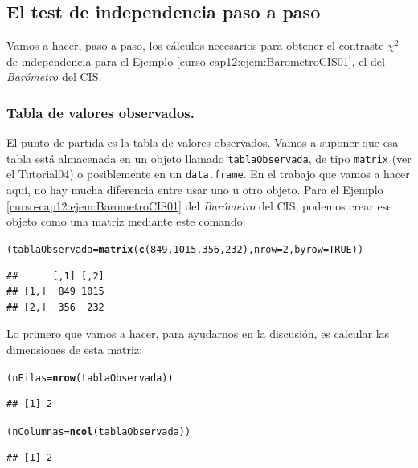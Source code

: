 \documentclass[10pt,a4paper]{article}\usepackage[]{graphicx}\usepackage[]{color}
\makeatletter
\newcommand{\hlnum}[1]{\textcolor[rgb]{0.686,0.059,0.569}{#1}}%
\newcommand{\hlstd}[1]{\textcolor[rgb]{0.345,0.345,0.345}{#1}}%
\newcommand{\hlkwb}[1]{\textcolor[rgb]{0.69,0.353,0.396}{#1}}%
\newcommand{\hlkwc}[1]{\textcolor[rgb]{0.333,0.667,0.333}{#1}}%
\newcommand{\hlkwd}[1]{\textcolor[rgb]{0.737,0.353,0.396}{\textbf{#1}}}%
\newenvironment{kframe}{%
 \def\at@end@of@kframe{}%
 \ifinner\ifhmode%
  \def\at@end@of@kframe{\end{minipage}}%
  \begin{minipage}{\columnwidth}%
 \fi\fi%
 \def\FrameCommand##1{\hskip\@totalleftmargin \hskip-\fboxsep
 \colorbox{shadecolor}{##1}\hskip-\fboxsep
     \hskip-\linewidth \hskip-\@totalleftmargin \hskip\columnwidth}%
 \MakeFramed {\advance\hsize-\width
   \@totalleftmargin\z@ \linewidth\hsize
   \@setminipage}}%
 {\par\unskip\endMakeFramed%
 \at@end@of@kframe}
\newenvironment{knitrout}{}{} %
\newcounter {cont01}
\makeatother
\begin{document}
\subsection{El test de independencia paso a paso}
\label{tut12:TestIndependenciaPasoAPaso}

Vamos a hacer, paso a paso, los cálculos necesarios para obtener el contraste $\chi^2$ de independencia para el Ejemplo \ref{curso-cap12:ejem:BarometroCIS01}, el del {\em Barómetro} del CIS.

\subsubsection*{Tabla de valores observados.}
\label{tut12:subsubsec:TablaValoresObservados}


El punto de partida es la tabla de valores observados. Vamos a suponer que esa tabla está almacenada en un objeto llamado {\tt tablaObservada}, de tipo {\tt matrix} (ver el Tutorial04) o posiblemente en un {\tt data.frame}. En el trabajo que vamos a hacer aquí, no hay mucha diferencia entre usar uno u otro objeto. Para el Ejemplo \ref{curso-cap12:ejem:BarometroCIS01} del {\em Barómetro} del CIS, podemos crear ese objeto como una matriz mediante este comando:


\begin{knitrout}
\color{fgcolor}\begin{kframe}
\begin{alltt}
\hlstd{(tablaObservada} \hlkwb{=} \hlkwd{matrix}\hlstd{(} \hlkwd{c}\hlstd{(}\hlnum{849}\hlstd{,} \hlnum{1015}\hlstd{,} \hlnum{356}\hlstd{,} \hlnum{232}\hlstd{),}  \hlkwc{nrow}\hlstd{=} \hlnum{2}\hlstd{,} \hlkwc{byrow} \hlstd{=} \hlnum{TRUE}\hlstd{))}
\end{alltt}
\begin{verbatim}
##      [,1] [,2]
## [1,]  849 1015
## [2,]  356  232
\end{verbatim}
\end{kframe}
\end{knitrout}

Lo primero que vamos a hacer, para ayudarnos en la discusión, es calcular las dimensiones de esta matriz:

\begin{knitrout}
\color{fgcolor}\begin{kframe}
\begin{alltt}
\hlstd{(nFilas} \hlkwb{=} \hlkwd{nrow}\hlstd{(tablaObservada))}
\end{alltt}
\begin{verbatim}
## [1] 2
\end{verbatim}
\begin{alltt}
\hlstd{(nColumnas} \hlkwb{=} \hlkwd{ncol}\hlstd{(tablaObservada))}
\end{alltt}
\begin{verbatim}
## [1] 2
\end{verbatim}
\end{kframe}
\end{knitrout}
\end{document}
